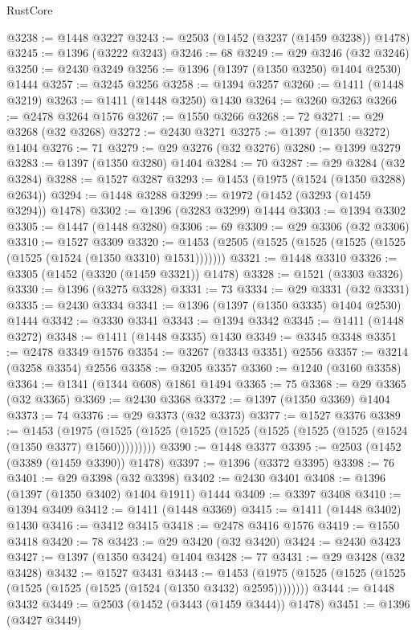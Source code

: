 \begin{lexlean}{RustCore}
\begin{coremodule}
@3238 := @1448 @3227
@3243 := @2503 (@1452 (@3237 (@1459 @3238)) @1478)
@3245 := @1396 (@3222 @3243)
@3246 := 68
@3249 := @29 @3246 (@32 @3246)
@3250 := @2430 @3249
@3256 := @1396 (@1397 (@1350 @3250) @1404 @2530) @1444
@3257 := @3245 @3256
@3258 := @1394 @3257
@3260 := @1411 (@1448 @3219)
@3263 := @1411 (@1448 @3250) @1430
@3264 := @3260 @3263
@3266 := @2478 @3264 @1576
@3267 := @1550 @3266
@3268 := 72
@3271 := @29 @3268 (@32 @3268)
@3272 := @2430 @3271
@3275 := @1397 (@1350 @3272) @1404
@3276 := 71
@3279 := @29 @3276 (@32 @3276)
@3280 := @1399 @3279
@3283 := @1397 (@1350 @3280) @1404
@3284 := 70
@3287 := @29 @3284 (@32 @3284)
@3288 := @1527 @3287
@3293 := @1453 (@1975 (@1524 (@1350 @3288) @2634))
@3294 := @1448 @3288
@3299 := @1972 (@1452 (@3293 (@1459 @3294)) @1478)
@3302 := @1396 (@3283 @3299) @1444
@3303 := @1394 @3302
@3305 := @1447 (@1448 @3280)
@3306 := 69
@3309 := @29 @3306 (@32 @3306)
@3310 := @1527 @3309
@3320 := @1453 (@2505 (@1525 (@1525 (@1525 (@1525 (@1525 (@1524 (@1350 @3310) @1531)))))))
@3321 := @1448 @3310
@3326 := @3305 (@1452 (@3320 (@1459 @3321)) @1478)
@3328 := @1521 (@3303 @3326)
@3330 := @1396 (@3275 @3328)
@3331 := 73
@3334 := @29 @3331 (@32 @3331)
@3335 := @2430 @3334
@3341 := @1396 (@1397 (@1350 @3335) @1404 @2530) @1444
@3342 := @3330 @3341
@3343 := @1394 @3342
@3345 := @1411 (@1448 @3272)
@3348 := @1411 (@1448 @3335) @1430
@3349 := @3345 @3348
@3351 := @2478 @3349 @1576
@3354 := @3267 (@3343 @3351) @2556
@3357 := @3214 (@3258 @3354) @2556
@3358 := @3205 @3357
@3360 := @1240 (@3160 @3358)
@3364 := @1341 (@1344 @608) @1861 @1494
@3365 := 75
@3368 := @29 @3365 (@32 @3365)
@3369 := @2430 @3368
@3372 := @1397 (@1350 @3369) @1404
@3373 := 74
@3376 := @29 @3373 (@32 @3373)
@3377 := @1527 @3376
@3389 := @1453
    (@1975 (@1525 (@1525 (@1525 (@1525 (@1525 (@1525 (@1525 (@1524 (@1350 @3377) @1560)))))))))
@3390 := @1448 @3377
@3395 := @2503 (@1452 (@3389 (@1459 @3390)) @1478)
@3397 := @1396 (@3372 @3395)
@3398 := 76
@3401 := @29 @3398 (@32 @3398)
@3402 := @2430 @3401
@3408 := @1396 (@1397 (@1350 @3402) @1404 @1911) @1444
@3409 := @3397 @3408
@3410 := @1394 @3409
@3412 := @1411 (@1448 @3369)
@3415 := @1411 (@1448 @3402) @1430
@3416 := @3412 @3415
@3418 := @2478 @3416 @1576
@3419 := @1550 @3418
@3420 := 78
@3423 := @29 @3420 (@32 @3420)
@3424 := @2430 @3423
@3427 := @1397 (@1350 @3424) @1404
@3428 := 77
@3431 := @29 @3428 (@32 @3428)
@3432 := @1527 @3431
@3443 := @1453 (@1975 (@1525 (@1525 (@1525 (@1525 (@1525 (@1525 (@1524 (@1350 @3432) @2595))))))))
@3444 := @1448 @3432
@3449 := @2503 (@1452 (@3443 (@1459 @3444)) @1478)
@3451 := @1396 (@3427 @3449)

\end{coremodule}
\end{lexlean}
